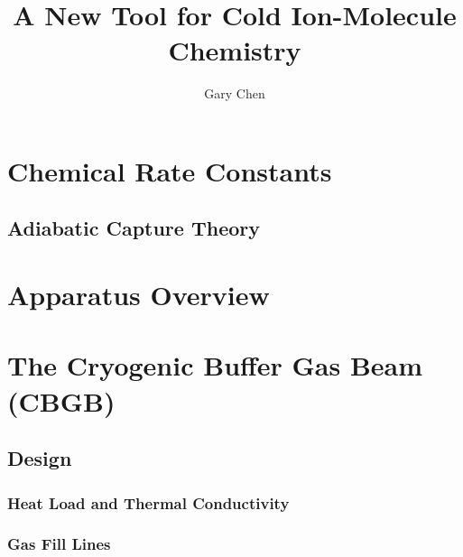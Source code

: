 \documentclass [PhD,nolistoftables,scheader] {uclathes}
\title          {A New Tool for Cold Ion-Molecule Chemistry}
\author         {Gary Chen}
\begin{document}
\makeintropages


%	
	
%	
	
\chapter{Chemical Rate Constants}
	
	
	\section{Adiabatic Capture Theory}
	

%	

\chapter{Apparatus Overview}


\chapter{The Cryogenic Buffer Gas Beam (CBGB)}


	\section{Design}
	
	
		\subsection{Heat Load and Thermal Conductivity}
		
		
		\subsection{Gas Fill Lines}
		
	
\end{document}

